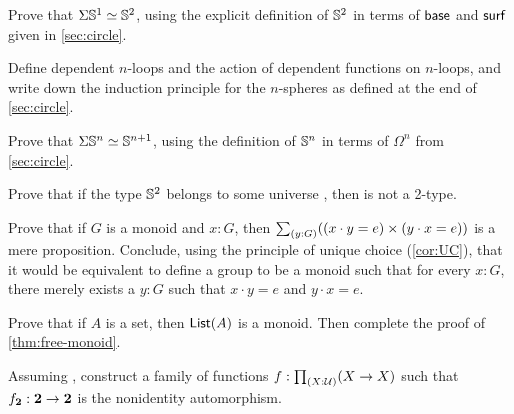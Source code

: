 \begin{ex}\label{ex:suspS1}
  Prove that $\Sigma \mathbb{S}^1 \simeq \mathbb{S}^2$, using the explicit definition of $\mathbb{S}^2$ in terms of $\mathsf{base}$ and $\mathsf{surf}$ given in \autoref{sec:circle}.
\end{ex}

\begin{ex}\label{ex:nspheres}
  Define dependent $n$-loops and the action of dependent functions on $n$-loops, and write down the induction principle for the $n$-spheres as defined at the end of \autoref{sec:circle}.
\end{ex}

\begin{ex}
  Prove that $\Sigma \mathbb{S}^n \simeq \mathbb{S}^{n+1}$, using the definition of $\mathbb{S}^n$ in terms of $\Omega^n$ from \autoref{sec:circle}.
\end{ex}

\begin{ex}
  Prove that if the type $\mathbb{S}^2$ belongs to some universe \type, then \type is not a 2-type.
\end{ex}

\begin{ex}
  Prove that if $G$ is a monoid and $x:G$, then $\sm{y:G}((x\cdot y = e) \times (y\cdot x =e))$ is a mere proposition.
  Conclude, using the principle of unique choice (\autoref{cor:UC}), that it would be equivalent to define a group to be a monoid such that for every $x:G$, there merely exists a $y:G$ such that $x\cdot y = e$ and $y\cdot x=e$.
\end{ex}

\begin{ex}\label{ex:free-monoid}
  Prove that if $A$ is a set, then $\mathsf{List}(A)$ is a monoid.
  Then complete the proof of \autoref{thm:free-monoid}.
\end{ex}

\begin{ex}\label{ex:unnatural-endomorphisms}
  Assuming \LEM{}, construct a family of functions $f:\prd{X:\type}(X\to X)$ such that $f_\mathbf{2}:\mathbf{2}\to\mathbf{2}$ is the nonidentity automorphism.
\end{ex}

